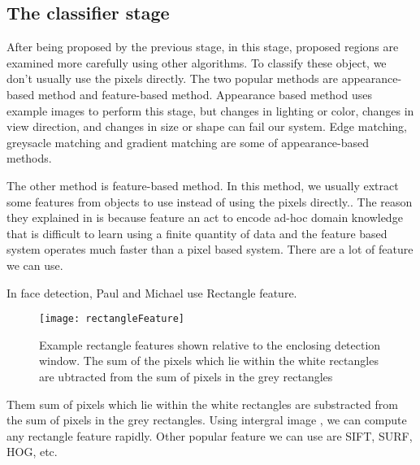 \subsection{The classifier stage}

After being proposed by the previous stage, in this stage, proposed regions are examined more carefully using other algorithms.
To classify these object, we don't usually use the pixels directly. The two popular methods are appearance-based method and feature-based method. 
Appearance based method uses example images to perform this stage, but changes in lighting or color, changes in view direction, and changes in size or shape can fail our system. Edge matching, greysacle matching and gradient matching are some of appearance-based methods.

The other method is feature-based method. In this method, we usually extract some features from objects to use instead of using the pixels directly.\cite{realtimeface}. The reason they explained in \cite{realtimeface} is because feature an act to encode ad-hoc domain knowledge that is difficult to learn using a finite quantity of data and the feature based system operates much faster than a pixel based system. There are a lot of feature we can use. 

In face detection\cite{realtimeface}, Paul and Michael use Rectangle feature. \\
\begin{figure}
	\centering
	\texttt{[image: rectangleFeature]}
	\caption{Example rectangle features shown relative to the enclosing detection window. The sum of the pixels which lie within the white rectangles are ubtracted from the sum of pixels in the grey rectangles \cite{realtimeface}}
\end{figure}
Them sum of pixels which lie within the white rectangles are substracted from the sum of pixels in the grey rectangles. Using intergral image \cite{realtimeface}, we can compute any rectangle feature rapidly. Other popular feature we can use are SIFT, SURF, HOG, etc.